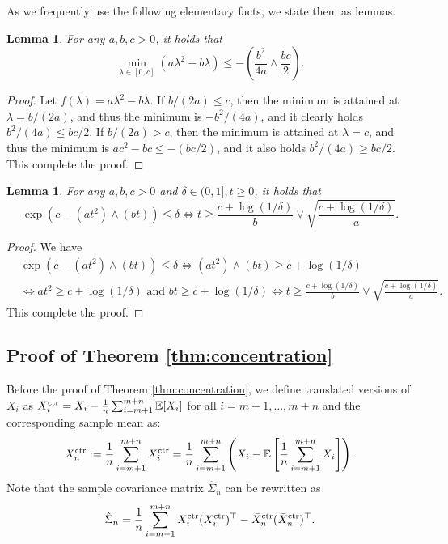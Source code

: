 \documentclass[12pt,reqno]{amsart}
\newtheorem{lemma}[theorem]{Lemma}
\theoremstyle{remark}
\theoremstyle{definition}
\newcommand{\E}{\mathbb{E}}
\newcommand{\ctr}{\textnormal{ctr}}
\begin{document}
As we frequently use the following elementary facts, we state them as lemmas.
\begin{lemma}\label{lem:elem1}
    For any $a,b,c>0$, it holds that
    \begin{equation*}
        \min_{\lambda\in[0,c]}\left(a\lambda^{2}-b\lambda\right)\le -\left(\frac{b^{2}}{4a}\wedge \frac{bc}{2}\right).
    \end{equation*}
\end{lemma}
\begin{proof}
    Let $f(\lambda)=a\lambda^{2}-b\lambda$.
    If $b/(2a)\le c$, then the minimum is attained at $\lambda=b/(2a)$, and thus the minimum is $-b^{2}/(4a)$, and it clearly holds $b^{2}/(4a)\le bc/2$.
    If $b/(2a)>c$, then the minimum is attained at $\lambda=c$, and thus the minimum is $ac^{2}-bc\le -(bc/2)$, and it also holds $b^{2}/(4a)\ge bc/2$.
    This complete the proof.
\end{proof}

\begin{lemma}\label{lem:elem2}
    For any $a,b,c>0$ and $\delta\in(0,1],t\ge 0$, it holds that
    \begin{equation*}
        \exp\left(c-(at^{2})\wedge (bt)\right)\le \delta \iff t\ge \frac{c+\log\left(1/\delta\right)}{b}\vee \sqrt{\frac{c+\log\left(1/\delta\right)}{a}}.
    \end{equation*}
\end{lemma}

\begin{proof}
    We have
    \begin{align*}
        &\exp\left(c-(at^{2})\wedge (bt)\right)\le \delta 
        \iff (at^{2})\wedge (bt)\ge c+\log\left(1/\delta\right)\\
        &\iff at^{2}\ge c+\log\left(1/\delta\right)\text{ and }bt\ge c+\log\left(1/\delta\right)
        \iff t\ge \frac{c+\log\left(1/\delta\right)}{b}\vee \sqrt{\frac{c+\log\left(1/\delta\right)}{a}}.
    \end{align*}
    This complete the proof.
\end{proof}


\subsection{Proof of Theorem \ref{thm:concentration}}
Before the proof of Theorem \ref{thm:concentration}, we define translated versions of $X_{i}$ as $X_{i}^{\ctr}=X_{i}-\frac{1}{n}\sum_{i=m+1}^{m+n}\E[X_{i}]$ for all $i=m+1,\ldots,m+n$ and the corresponding sample mean as:
\begin{equation*}
    \bar{X}_{n}^{\ctr}:=\frac{1}{n}\sum_{i=m+1}^{m+n}X_{i}^{\ctr}=\frac{1}{n}\sum_{i=m+1}^{m+n}\left(X_{i}-\E\left[\frac{1}{n}\sum_{i=m+1}^{m+n}X_{i}\right]\right).
\end{equation*}
Note that the sample covariance matrix $\hat{\Sigma}_{n}$ can be rewritten as
\begin{equation*}
    \hat{\Sigma}_{n}=\frac{1}{n}\sum_{i=m+1}^{m+n}X_{i}^{\ctr}(X_{i}^{\ctr})^{\top}-\bar{X}_{n}^{\ctr}(\bar{X}_{n}^{\ctr})^{\top}.
\end{equation*}
\end{document}
